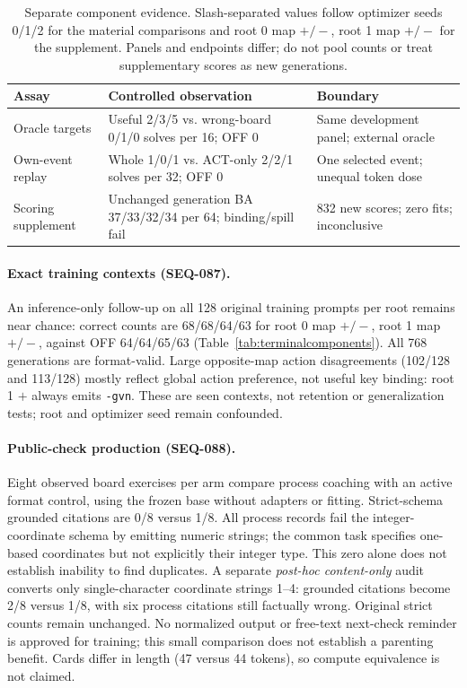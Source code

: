 \documentclass{article}
\begin{document}
\begin{table}[t]
\centering\small
\caption{Separate component evidence. Slash-separated values follow optimizer seeds 0/1/2 for the material comparisons and root 0 map $+/-$, root 1 map $+/-$ for the supplement. Panels and endpoints differ; do not pool counts or treat supplementary scores as new generations.}
\label{tab:components}
\begin{tabular}{@{}p{.20\linewidth}p{.39\linewidth}p{.33\linewidth}@{}}
\toprule
Assay & Controlled observation & Boundary \\
\midrule
Oracle targets & Useful 2/3/5 vs. wrong-board 0/1/0 solves per 16; OFF 0 & Same development panel; external oracle \\
Own-event replay & Whole 1/0/1 vs. ACT-only 2/2/1 solves per 32; OFF 0 & One selected event; unequal token dose \\
Scoring supplement & Unchanged generation BA 37/33/32/34 per 64; binding/spill fail & 832 new scores; zero fits; inconclusive \\
\bottomrule
\end{tabular}
\end{table}

\paragraph{Exact training contexts (SEQ-087).} An inference-only follow-up on all 128 original training prompts per root remains near chance: correct counts are 68/68/64/63 for root 0 map $+/-$, root 1 map $+/-$, against OFF 64/64/65/63 (Table~\ref{tab:terminalcomponents}). All 768 generations are format-valid. Large opposite-map action disagreements (102/128 and 113/128) mostly reflect global action preference, not useful key binding: root 1 $+$ always emits \texttt{-gvn}. These are seen contexts, not retention or generalization tests; root and optimizer seed remain confounded.

\paragraph{Public-check production (SEQ-088).} Eight observed board exercises per arm compare process coaching with an active format control, using the frozen base without adapters or fitting. Strict-schema grounded citations are 0/8 versus 1/8. All process records fail the integer-coordinate schema by emitting numeric strings; the common task specifies one-based coordinates but not explicitly their integer type. This zero alone does not establish inability to find duplicates. A separate \emph{post-hoc content-only} audit converts only single-character coordinate strings 1--4: grounded citations become 2/8 versus 1/8, with six process citations still factually wrong. Original strict counts remain unchanged. No normalized output or free-text next-check reminder is approved for training; this small comparison does not establish a parenting benefit. Cards differ in length (47 versus 44 tokens), so compute equivalence is not claimed.
\end{document}
